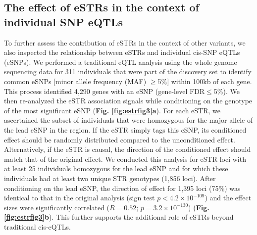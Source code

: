 \subsection{The effect of eSTRs in the context of individual SNP eQTLs}
To further assess the contribution of eSTRs in the context of other variants, we also inspected the relationship between eSTRs and individual cis-SNP eQTLs (eSNPs). We performed a traditional eQTL analysis using the whole genome sequencing data for 311 individuals that were part of the discovery set to identify common eSNPs [minor allele frequency (MAF) $\geq$5\%] within 100kb of each gene. This process identified 4,290 genes with an eSNP (gene-level FDR$\leq$5\%). We then re-analyzed the eSTR association signals while conditioning on the genotype of the most significant eSNP (\textbf{Fig. \ref{fig:estrfig3}a}). For each eSTR, we ascertained the subset of individuals that were homozygous for the major allele of the lead eSNP in the region. If the eSTR simply tags this eSNP, its conditioned effect should be randomly distributed compared to the unconditioned effect. Alternatively, if the eSTR is causal, the direction of the conditioned effect should match that of the original effect. We conducted this analysis for eSTR loci with at least 25 individuals homozygous for the lead eSNP and for which these individuals had at least two unique STR genotypes (1,856 loci). After conditioning on the lead eSNP, the direction of effect for 1,395 loci (75\%) was identical to that in the original analysis (sign test $p<4.2 \times 10^{-109}$) and the effect sizes were significantly correlated ($R=0.52$; $p=3.2\times10^{-130}$) (\textbf{Fig. \ref{fig:estrfig3}b}). This further supports the additional role of eSTRs beyond traditional cis-eQTLs. 

